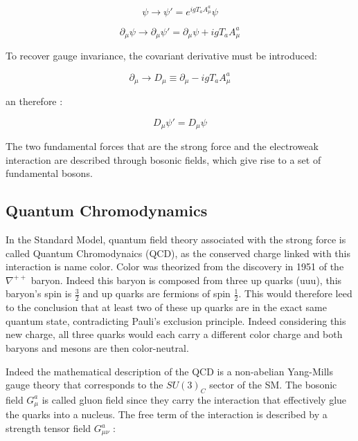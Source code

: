 \begin{equation}
    \psi \rightarrow \psi' = e^{igT_{a}A_{\mu}^a}\psi
\end{equation}

\begin{equation}
    \partial_{\mu}\psi \rightarrow \partial_{\mu}\psi' = \partial_{\mu}\psi + igT_{a}A_{\mu}^a
\end{equation}

To recover gauge invariance, the covariant derivative must be introduced:

\begin{equation}
    \partial_{\mu} \rightarrow D_{\mu} \equiv \partial_{\mu} - igT_{a}A_{\mu}^a
\end{equation}

an therefore :

\begin{equation}
    D_{\mu}\psi' = D_{\mu}\psi
\end{equation}

The two fundamental forces that are the strong force and the electroweak interaction are described through bosonic fields, which give rise to a set of fundamental bosons.

\subsection{Quantum Chromodynamics}
\label{sec:QCD}

In the Standard Model, quantum field theory associated with the strong force is called Quantum Chromodynaics (QCD), as the conserved charge linked with this interaction is name color. Color was theorized from the discovery in 1951 of the $\nabla^{++}$ baryon. Indeed this baryon is composed from three up quarks (uuu), this baryon's spin is $\frac{3}{2}$ and up quarks are fermions of spin $\frac{1}{2}$. This would therefore leed to the conclusion that at least two of these up quarks are in the exact same quantum state, contradicting Pauli's exclusion principle. Indeed considering this new charge, all three quarks would each carry a different color charge and both baryons and mesons are then color-neutral.

Indeed the mathematical description of the QCD is a non-abelian Yang-Mills gauge theory that corresponds to the $SU(3)_C$ sector of the SM. The bosonic field $G_{\mu}^a$ is called gluon field since they carry the interaction that effectively glue the quarks into a nucleus. The free term of the interaction is described by a strength tensor field $G_{\mu\nu}^a$ :

